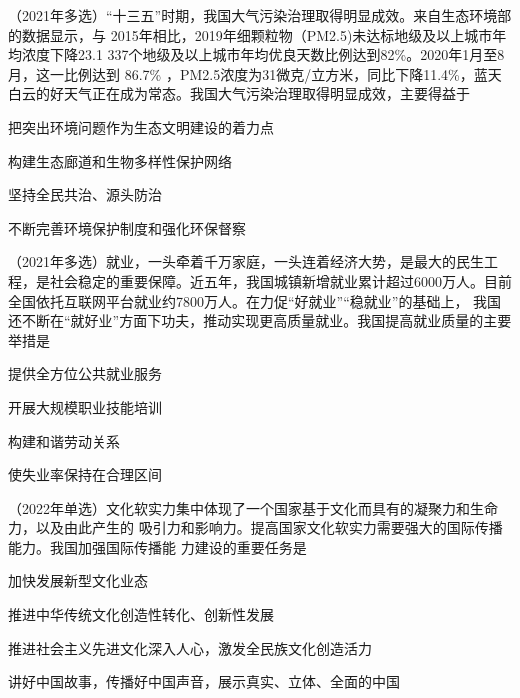 \documentclass[lang=cn,newtx,10pt,scheme=chinese,pad,twocol]{zznote}
\begin{document}
\begin{example}
	（2021年多选）“十三五”时期，我国大气污染治理取得明显成效。来自生态环境部的数据显示，与
	2015年相比，2019年细颗粒物（PM2.5)未达标地级及以上城市年均浓度下降23.1%
	337个地级及以上城市年均优良天数比例达到82\%。2020年1月至8月，这一比例达到
	86.7\% ，PM2.5浓度为31微克/立方米，同比下降11.4\%，蓝天白云的好天气正在成为常态。我国大气污染治理取得明显成效，主要得益于
	\begin{choice}
		\item 把突出环境问题作为生态文明建设的着力点
		\item 构建生态廊道和生物多样性保护网络
		\item 坚持全民共治、源头防治
		\item 不断完善环境保护制度和强化环保督察
	\end{choice}
\end{example}

\begin{example}
	（2021年多选）就业，一头牵着千万家庭，一头连着经济大势，是最大的民生工程，是社会稳定的重要保障。近五年，我国城镇新增就业累计超过6000万人。目前全国依托互联网平台就业约7800万人。在力促“好就业”“稳就业”的基础上， 我国还不断在“就好业”方面下功夫，推动实现更高质量就业。我国提高就业质量的主要举措是

	\begin{choice}
		\item 提供全方位公共就业服务
		\item 开展大规模职业技能培训
		\item 构建和谐劳动关系
		\item 使失业率保持在合理区间
	\end{choice}
\end{example}

\begin{example}
	（2022年单选）文化软实力集中体现了一个国家基于文化而具有的凝聚力和生命力，以及由此产生的
	吸引力和影响力。提高国家文化软实力需要强大的国际传播能力。我国加强国际传播能
	力建设的重要任务是
	\begin{choice}
		\item 加快发展新型文化业态
		\item 推进中华传统文化创造性转化、创新性发展
		\item 推进社会主义先进文化深入人心，激发全民族文化创造活力
		\item 讲好中国故事，传播好中国声音，展示真实、立体、全面的中国
	\end{choice}
\end{example}
\end{document}
